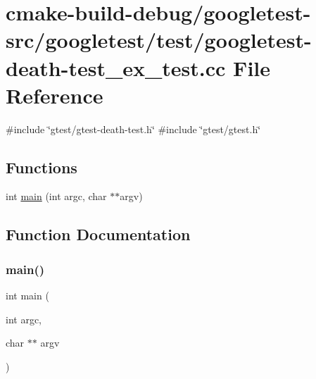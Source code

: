 \hypertarget{googletest-death-test__ex__test_8cc}{}\section{cmake-\/build-\/debug/googletest-\/src/googletest/test/googletest-\/death-\/test\+\_\+ex\+\_\+test.cc File Reference}
\label{googletest-death-test__ex__test_8cc}
{\ttfamily \#include \char`\"{}gtest/gtest-\/death-\/test.\+h\char`\"{}}\newline
{\ttfamily \#include \char`\"{}gtest/gtest.\+h\char`\"{}}\newline
\subsection*{Functions}
\begin{DoxyCompactItemize}
\item 
int \mbox{\hyperlink{googletest-death-test__ex__test_8cc_a3c04138a5bfe5d72780bb7e82a18e627}{main}} (int argc, char $\ast$$\ast$argv)
\end{DoxyCompactItemize}


\subsection{Function Documentation}
\mbox{\label{googletest-death-test__ex__test_8cc_a3c04138a5bfe5d72780bb7e82a18e627}} 
\subsubsection{\texorpdfstring{main()}{main()}}
{\footnotesize\ttfamily int main (\begin{DoxyParamCaption}\item[{int}]{argc,  }\item[{char $\ast$$\ast$}]{argv }\end{DoxyParamCaption})}


